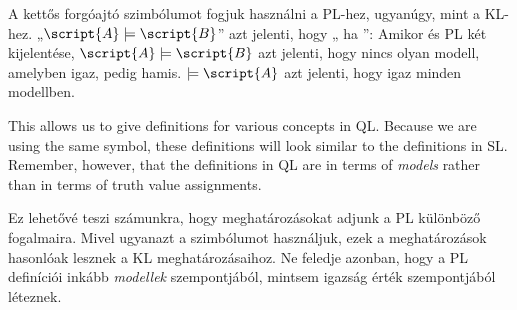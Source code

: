 A kettős forgóajtó szimbólumot fogjuk használni a PL-hez, ugyanúgy, mint a KL-hez. „$\script{A}\models\script{B}$” azt jelenti, hogy „ ha ”: Amikor  és  PL két kijelentése, $\script{A}\models\script{B}$  azt jelenti, hogy nincs olyan modell, amelyben  igaz,  pedig hamis. $\models\script{A}$ azt jelenti, hogy   igaz minden modellben.

This allows us to give definitions for various concepts in QL. Because we are using the same symbol, these definitions will look similar to the definitions in SL. Remember, however, that the definitions in QL are in terms of \emph{models} rather than in terms of truth value assignments.

Ez lehetővé teszi számunkra, hogy meghatározásokat adjunk a PL különböző fogalmaira. Mivel ugyanazt a szimbólumot használjuk, ezek a meghatározások hasonlóak lesznek a KL meghatározásaihoz. Ne feledje azonban, hogy a PL definíciói inkább \emph{modellek} szempontjából, mintsem igazság érték szempontjából léteznek. 

